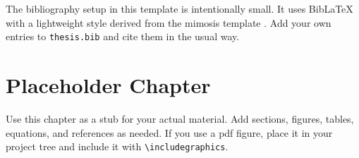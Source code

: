 \documentclass[12pt]{uncthesis}
\begin{document}
The bibliography setup in this template is intentionally small. It uses
BibLaTeX with a lightweight style derived from the mimosis template
\cite{mimosis-template}. Add your own entries to \texttt{thesis.bib}
and cite them in the usual way.

\chapter{Placeholder Chapter}

Use this chapter as a stub for your actual material. Add sections,
figures, tables, equations, and references as needed. If you use a
\gls{pdf} figure, place it in your project tree and include it with
\verb|\includegraphics|.

\backmatter

\printbibliography
\end{document}
